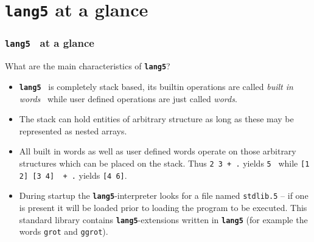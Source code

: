 \documentclass{beamer}
\newcommand*{\F}{{\tt\bf lang5}}
\begin{document}
 \section{\F{ } at a glance}
  \begin{frame}
   \frametitle{\F{ } at a glance}
   What are the main characteristics of \F?
   \begin{itemize}
    \item \F{ } is completely stack based, its builtin operations are called
     \emph{built in words}{ } while user defined operations are 
     just called \emph{words}.
    \item The stack can hold entities of arbitrary structure as long as these
     may be represented as nested arrays.
    \item All built in words as well as user defined words operate on 
     those arbitrary structures which can be placed on the stack. Thus
     {\tt 2 3 + .} yields {\tt 5}{ } while 
     {\tt [1 2] [3 4]{ } + .} yields {\tt [4 6]}.
    \item During startup the \F-interpreter looks for a file named
     {\tt stdlib.5} -- if one is present it will be loaded prior to loading
     the program to be executed. This standard library contains \F-extensions
     written in \F{ } (for example the words {\tt grot} and {\tt ggrot}).
   \end{itemize}
  \end{frame}
%
\end{document}
